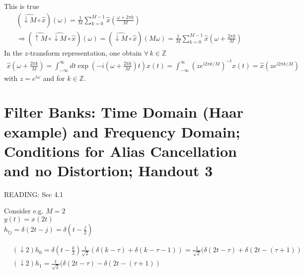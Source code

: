 \documentclass[twoside]{amsart}
\theoremstyle{plain}
\theoremstyle{definition}
\theoremstyle{remark}
\numberwithin{equation}{section}
\begin{document}
This is true
\[
\begin{gathered}
  (\widehat{\downarrow M} \circ \widehat{x})(\omega) = \frac{1}{M} \sum_{k=0}^{M-1} \widehat{x}\left( \frac{ \omega + 2\pi k}{M} \right) \\ 
\Longrightarrow \boxed{ (\widehat{ \uparrow M } \circ \widehat{ \downarrow M } \circ \widehat{x})(\omega) = (\widehat{\downarrow M} \circ \widehat{x})( M \omega) = \frac{1}{M} \sum_{k=0}^{M-1} \widehat{x}(\omega + \frac{2\pi k}{M}) }
\end{gathered}
\]
In the $z$-transform representation, one obtain $\forall \, k \in \mathbb{Z}$
\[
\begin{gathered}
  \widehat{x}(\omega + \frac{2\pi k}{M}) = \int_{-\infty}^{\infty} dt \exp{ (-i (\omega + \frac{2\pi k}{M}) t) } x(t) = \int_{-\infty}^{\infty} (ze^{i2\pi k/M })^{-t}x(t) = \widehat{x}(ze^{i2\pi k/M} ) 
\end{gathered}
\]
with $z = e^{i \omega}$ and for $k\in \mathbb{Z}$.


\section{Filter Banks: Time Domain (Haar example) and Frequency Domain; Conditions for Alias Cancellation and no Distortion; Handout 3}

READING: Sec 4.1 \cite{GStrangTNguyen1996}

Consider 
e.g. $M=2$ \\
\phantom{ e.g. } $y(t) = x(2t)$ \\
\phantom{ e.g. } $h_{tj} = \delta(2t-j) = \delta(t-\frac{j}{2} )$

\begin{equation}
\begin{aligned}\label{Eq:simpleanalysisM=2}
  & (\downarrow 2)h_0 = \delta(t- \frac{k}{2} ) \frac{1}{\sqrt{2}} ( \delta(k-\tau) + \delta(k-\tau -1) ) = \frac{1}{\sqrt{2}} ( \delta(2t-\tau) + \delta(2t- (\tau + 1)) \\ 
  & (\downarrow 2)h_1 = \frac{1}{\sqrt{2}} ( \delta(2t-\tau) - \delta(2t - (\tau + 1))  
\end{aligned}
\end{equation}
\end{document}

